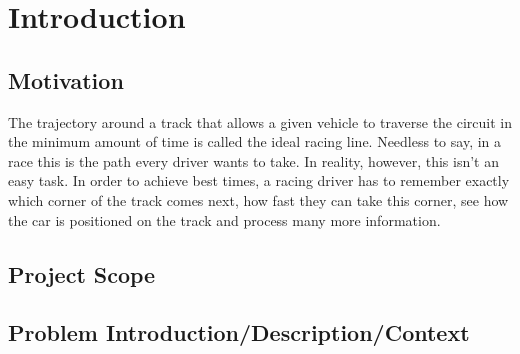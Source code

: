 \section{Introduction}
\label{sec:intro}

\subsection{Motivation}
The trajectory around a track that allows a given vehicle to traverse the circuit in the minimum amount of time is called the ideal racing line. Needless to say, in a race this is the path every driver wants to take. In reality, however, this isn't an easy task. In order to achieve best times, a racing driver has to remember exactly which corner of the track comes next, how fast they can take this corner, see how the car is positioned on the track and process many more information. 

\subsection{Project Scope}

\subsection{Problem Introduction/Description/Context}

\clearpage